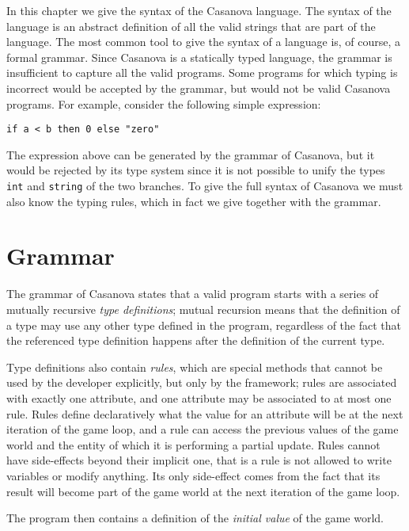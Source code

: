 In this chapter we give the syntax of the Casanova language. The syntax of the language is an abstract definition of all the valid strings that are part of the language. The most common tool to give the syntax of a language is, of course, a formal grammar. Since Casanova is a statically typed language, the grammar is insufficient to capture all the valid programs. Some programs for which typing is incorrect would be accepted by the grammar, but would not be valid Casanova programs. For example, consider the following simple expression:

\begin{lstlisting}
if a < b then 0 else "zero"
\end{lstlisting}

The expression above can be generated by the grammar of Casanova, but it would be rejected by its type system since it is not possible to unify the types \texttt{int} and \texttt{string} of the two branches. To give the full syntax of Casanova we must also know the typing rules, which in fact we give together with the grammar.

\section{Grammar}
The grammar of Casanova states that a valid program starts with a series of mutually recursive \textit{type definitions}; mutual recursion means that the definition of a type may use any other type defined in the program, regardless of the fact that the referenced type definition happens after the definition of the current type. 

Type definitions also contain \textit{rules}, which are special methods that cannot be used by the developer explicitly, but only by the framework; rules are associated with exactly one attribute, and one attribute may be associated to at most one rule. Rules define declaratively what the value for an attribute will be at the next iteration of the game loop, and a rule can access the previous values of the game world and the entity of which it is performing a partial update. Rules cannot have side-effects beyond their implicit one, that is a rule is not allowed to write variables or modify anything. Its only side-effect comes from the fact that its result will become part of the game world at the next iteration of the game loop. 

The program then contains a definition of the \textit{initial value} of the game world. 

